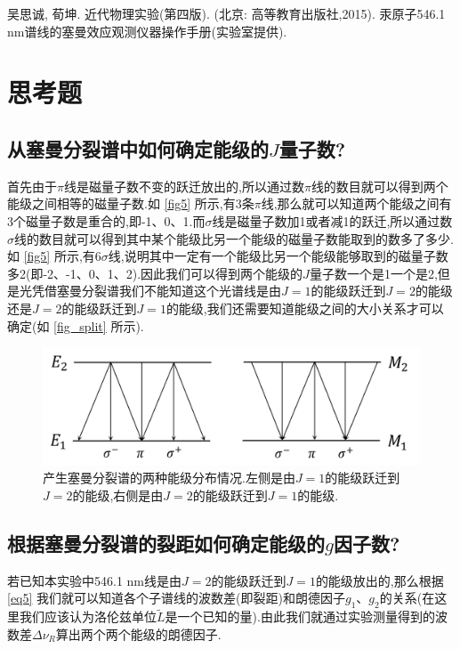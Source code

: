 \documentclass[font=default]{mpltx}
\begin{document}

\begin{thebibliography}{}

   吴思诚, 荀坤. 近代物理实验(第四版). (北京: 高等教育出版社,2015).
   汞原子546.1 nm谱线的塞曼效应观测仪器操作手册(实验室提供).
\end{thebibliography}
  
\clearpage %
\appendix %
\section{思考题}
\subsection{从塞曼分裂谱中如何确定能级的$J$量子数?}
首先由于$\pi$线是磁量子数不变的跃迁放出的,所以通过数$\pi$线的数目就可以得到两个能级之间相等的磁量子数.如 \autoref{fig5} 所示,有3条$\pi$线,那么就可以知道两个能级之间有3个磁量子数是重合的,即-1、0、1.而$\sigma$线是磁量子数加1或者减1的跃迁,所以通过数$\sigma$线的数目就可以得到其中某个能级比另一个能级的磁量子数能取到的数多了多少.如 \autoref{fig5} 所示,有6$\sigma$线,说明其中一定有一个能级比另一个能级能够取到的磁量子数多2(即-2、-1、0、1、2).因此我们可以得到两个能级的$J$量子数一个是1一个是2,但是光凭借塞曼分裂谱我们不能知道这个光谱线是由$J=1$的能级跃迁到$J=2$的能级还是$J=2$的能级跃迁到$J=1$的能级,我们还需要知道能级之间的大小关系才可以确定(如 \autoref{fig_split} 所示).
\begin{figure}[h]
  \centering
  \includegraphics[width=0.8\linewidth]{fig/split.png}
  \caption{产生塞曼分裂谱的两种能级分布情况.左侧是由$J=1$的能级跃迁到$J=2$的能级,右侧是由$J=2$的能级跃迁到$J=1$的能级.}
  \label{fig_split}
\end{figure}
\subsection{根据塞曼分裂谱的裂距如何确定能级的$g$因子数?}
若已知本实验中546.1 nm线是由$J=2$的能级跃迁到$J=1$的能级放出的,那么根据 \autoref{eq5} 我们就可以知道各个子谱线的波数差(即裂距)和朗德因子$g_1$、$g_2$的关系(在这里我们应该认为洛伦兹单位$\widetilde{L}$是一个已知的量).由此我们就通过实验测量得到的波数差$\Delta\nu_R$算出两个两个能级的朗德因子.
\end{document}
